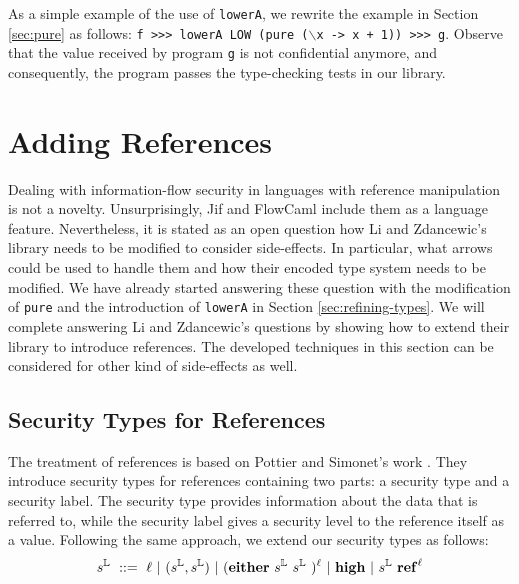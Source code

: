 \documentclass[times, 10pt,twocolumn]{article}
\begin{document}
As a simple example of the use of \texttt{lowerA},
we rewrite the example in Section \ref{sec:pure}
as follows: 
\texttt{f >>> lowerA LOW (pure ($\backslash$x -> x + 1)) >>> g}.
Observe that the value received by program \texttt{g} is not confidential
anymore, and consequently, the program passes the type-checking tests 
in our library. 


\section{Adding References} \label{sec:adding-references}

Dealing with information-flow security in languages with reference
manipulation is not a novelty. Unsurprisingly, Jif and FlowCaml include
them as a language feature. Nevertheless, it is stated as an open
question how Li and Zdancewic's library needs to be modified to
consider side-effects. In particular, what arrows 
could be used to handle them and how their encoded type system
needs to be modified. We have already started answering these 
question with the modification of \texttt{pure} 
and the introduction of \texttt{lowerA} in Section
\ref{sec:refining-types}. 
We will complete answering Li and Zdancewic's questions 
by showing how to extend their library to introduce references.
The developed techniques in this section can be considered 
for other kind of side-effects as well.


\subsection{Security Types for References}
The treatment of references is based on 
Pottier and Simonet's work \cite{Pottier:Simonet:POPL02}.
They introduce security types for references containing two 
parts: a security type and a security label. The 
security type provides information about the data that 
is referred to, while the security label gives a security 
level to the reference itself as a value. 
Following the same approach, we extend our 
security types as follows:
\[
\st\ ::=\ \ell\ |\ (\st,\st)\ |\ ({\mathbf{either}}\ \st\ \st\
)^{\ell}\ |\ \mathbf{high} \ |\ \st\ \mathbf{ref}^{\ell}
\]
\end{document}
